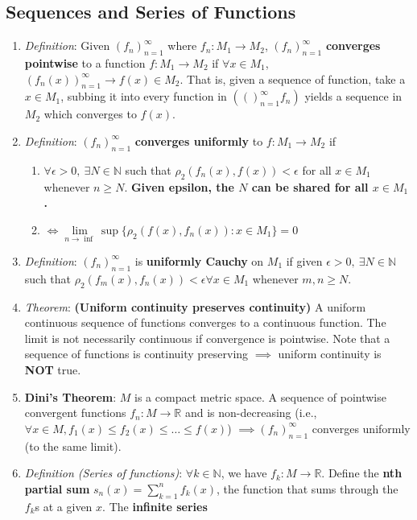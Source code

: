 \documentclass[10pt]{article}
\newcommand{\seqn}[1]{(#1)^\infty_{n=1}}
\newcommand{\real}{\mathbb{R}}
\newcommand{\nat}{\mathbb{N}}
\begin{document}
\begin{multicols*}{3}
	\section{Sequences and Series of Functions}
	\begin{enumerate}
		\item \emph{Definition}: Given $\seqn{f_{n}}$ where $f_{n}:M_{1}\to M_{2}$,
		$\seqn{f_{n}}$ \textbf{converges pointwise} to a function
		$f:M_{1} \to M_{2}$ if $\forall x\in M_{1}$,
		$\seqn{f_{n}(x)}\to f(x)\in M_{2}$. That is, given a sequence of function,
		take a $x\in M_{1}$, subbing it into every function in $\seqn(f_{n})$ yields
		a sequence in $M_{2}$ which converges to $f(x)$.
		\item \emph{Definition}: $\seqn{f_{n}}$ \textbf{converges uniformly} to
		$f:M_{1}\to M_{2}$ if
		\begin{enumerate}
			\item $\forall\epsilon>0,\ \exists N\in\nat$ such that
				$\rho_{2}(f_{n}(x), f(x))<\epsilon$ for all $x\in M_{1}$ whenever
				$n\geq N$. \textbf{Given epsilon, the $N$ can be shared for all
				$x\in M_{1}$.}
			\item
				$\iff \lim\limits_{n\to\inf}\sup\{\rho_{2}(f(x),f_{n}(x)):x\in M_{1}\}=0$
		\end{enumerate}
		\item \emph{Definition}: $\seqn{f_{n}}$ is \textbf{uniformly Cauchy} on
		$M_{1}$ if given $\epsilon>0,\ \exists N\in\nat$ such that
		$\rho_{2}(f_{m}(x),f_{n}(x))<\epsilon\forall x\in M_{1}$ whenever $m,n\geq N$.
		\item \emph{Theorem}: \textbf{(Uniform continuity preserves continuity)} A
			uniform continuous sequence of functions converges to a continuous
			function. The limit is not necessarily continuous if convergence is
			pointwise. Note that a sequence of functions is continuity preserving
			$\implies$ uniform continuity is \textbf{NOT} true.
		\item \textbf{Dini's Theorem}: $M$ is a compact metric space. A sequence of
			pointwise convergent functions $f_{n}:M\to\real$ and is non-decreasing
			(i.e., $\forall x\in M, f_{1}(x)\leq f_{2}(x)\leq\dots\leq f(x)$)
			$\implies \seqn{f_{n}}$ converges uniformly (to the same limit).
		\item \emph{Definition (Series of functions)}: $\forall k\in\nat$, we have
			$f_{k}:M\to\real$. Define the \textbf{nth partial sum}
			$s_{n}(x) = \sum\limits^{n}_{k=1}f_{k}(x)$, the function that sums through
			the $f_{k}$s at a given $x$. The \textbf{infinite series}

\end{enumerate}
\end{multicols*}
\end{document}
